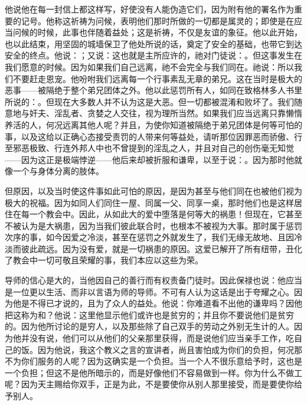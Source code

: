 \par

\par

他说他在每一封信上都这样写，好使没有人能伪造它们，因为附有他的署名作为重要的记号。他称这祈祷为问候，表明他们那时所做的一切都是属灵的；即使是在应当问候的时候，此事也伴随着益处；这是祈祷，不仅是友谊的象征。他以此开始，也以此结束，用坚固的城墙保卫了他处所说的话，奠定了安全的基础，也带它到达安全的终点。他说：；又说：这也就是主所应许的，祂对门徒说：。但这事发生在我们愿意的时候。因为如果我们自己远离，祂不会完全与我们同在。祂说：所以我们不要赶走恩宠。他吩咐我们远离每一个行事素乱无章的弟兄。这在当时是极大的恶事——被隔绝于整个弟兄团体之外。他以此惩罚所有人，如同在致格林多人书里所说的：。但现在大多数人并不认为这是大恶。但一切都被混淆和败坏了。我们随意地与奸夫、淫乱者、贪婪之人交往，视为理所当然。如果我们应当远离只靠懒惰养活的人，何况远离其他人呢？并且，为使你知道被隔绝于弟兄团体是何等可怕的事，以及这给以正确心态接受责罚的人带来何等益处，请听那位因罪恶而骄傲、行至邪恶极致、行连外邦人中也不曾提到的淫乱之人，并且对自己的创伤毫无知觉——因为这正是极端悖逆——他后来却被折服和谦卑，以至于说：。因为那时他就像一个与身体分离的肢体。\par

但原因，以及当时使这件事如此可怕的原因，是因为甚至与他们同在也被他们视为极大的祝福。因为如同人们同住一屋、同属一父、同享一桌，那时他们也是这样居住在每一个教会中。因此，从如此大的爱中堕落是何等大的祸患！但现在，它甚至不被认为是大祸患，因为当我们彼此联合时，也根本不被视为大事。那时属于惩罚次序的事，如今因爱之冷淡，甚至在惩罚之外就发生了，我们无缘无故地、且因冷淡而彼此疏远。因为没有爱，就是一切祸患的原因。这爱已解开了所有纽带，丑化了教会中一切可敬且荣耀的事，我们本应以这些为荣。\par

导师的信心是大的，当他因自己的善行而有权责备门徒时。因此保禄也说：他应当是一位更以生活、而非以言语为师的导师。不可有人认为这话是出于夸耀之心。因为他是不得已才说的，且为了众人的益处。他说：你难道看不出他的谦卑吗？因他把这称为和？他说：这里他显示他们或许也是贫穷的；并且你不要说他们是贫穷的。因为他所讨论的是穷人，以及那些除了自己双手的劳动之外别无生计的人。因为他并没有说，他们可以从他们的父亲那里获得，而是说他们应当亲手工作，吃自己的饭。因为他说，我这个教义之言的宣讲者，尚且害怕成为你们的负担，何况那不为你们服务的人呢？因为这确实是一个负担。当一个人不很乐意给予时，这也是一个负担；但这不是他所暗示的，而是好像他们不容易做到一样。你为什么不做工呢？因为天主赐给你双手，正是为此，不是要使你从别人那里接受，而是要使你给予别人。\par

